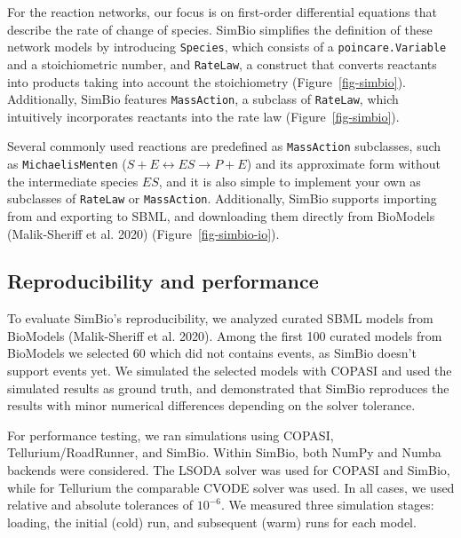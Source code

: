 \documentclass[
  letterpaper,
  DIV=11,
  numbers=noendperiod]{scrartcl}
\begin{document}
For the reaction networks, our focus is on first-order differential
equations that describe the rate of change of species. SimBio simplifies
the definition of these network models by introducing \texttt{Species},
which consists of a \texttt{poincare.Variable} and a stoichiometric
number, and \texttt{RateLaw}, a construct that converts reactants into
products taking into account the stoichiometry
(Figure~\ref{fig-simbio}). Additionally, SimBio features
\texttt{MassAction}, a subclass of \texttt{RateLaw}, which intuitively
incorporates reactants into the rate law (Figure~\ref{fig-simbio}).

Several commonly used reactions are predefined as \texttt{MassAction}
subclasses, such as \texttt{MichaelisMenten}
(\(S + E \leftrightarrow ES \rightarrow P + E\)) and its approximate
form without the intermediate species \(ES\), and it is also simple to
implement your own as subclasses of \texttt{RateLaw} or
\texttt{MassAction}. Additionally, SimBio supports importing from and
exporting to SBML, and downloading them directly from BioModels
(Malik-Sheriff et al. 2020) (Figure~\ref{fig-simbio-io}).



\hypertarget{reproducibility-and-performance}{%
\subsection{Reproducibility and
performance}\label{reproducibility-and-performance}}



To evaluate SimBio's reproducibility, we analyzed curated SBML models
from BioModels (Malik-Sheriff et al. 2020). Among the first 100 curated
models from BioModels we selected 60 which did not contains events, as
SimBio doesn't support events yet. We simulated the selected models with
COPASI and used the simulated results as ground truth, and demonstrated
that SimBio reproduces the results with minor numerical differences
depending on the solver tolerance.

For performance testing, we ran simulations using COPASI,
Tellurium/RoadRunner, and SimBio. Within SimBio, both NumPy and Numba
backends were considered. The LSODA solver was used for COPASI and
SimBio, while for Tellurium the comparable CVODE solver was used. In all
cases, we used relative and absolute tolerances of \(10^{-6}\). We
measured three simulation stages: loading, the initial (cold) run, and
subsequent (warm) runs for each model.
\end{document}

